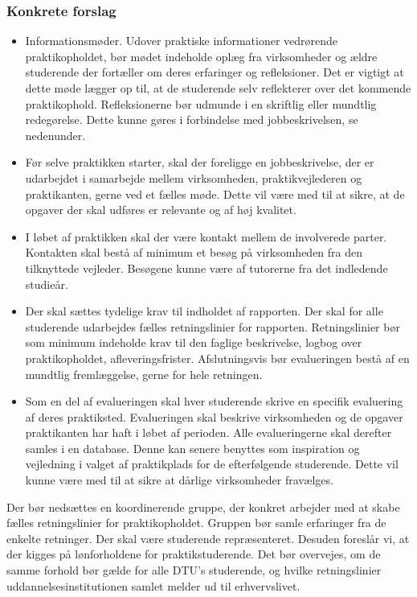 \subsubsection{Konkrete forslag}
\begin{itemize}
\item Informationsmøder. Udover praktiske informationer vedrørende praktikopholdet, bør mødet indeholde oplæg fra virksomheder og ældre studerende der fortæller om deres erfaringer og refleksioner. Det er vigtigt at dette møde lægger op til, at de studerende selv reflekterer over det kommende praktikophold. Refleksionerne bør udmunde i en skriftlig eller mundtlig redegørelse. Dette kunne gøres i forbindelse med jobbeskrivelsen, se nedenunder.

\item Før selve praktikken starter, skal der foreligge en jobbeskrivelse, der er udarbejdet i samarbejde mellem     virksomheden, praktikvejlederen og praktikanten, gerne ved et fælles møde. Dette vil være med til at sikre, at de opgaver der skal udføres er relevante og af høj kvalitet.

\item I løbet af praktikken skal der være kontakt mellem de involverede parter. Kontakten skal bestå af minimum et besøg på virksomheden fra den tilknyttede vejleder. Besøgene kunne være af tutorerne fra det indledende studieår.

\item Der skal sættes tydelige krav til indholdet af rapporten. Der skal for alle studerende udarbejdes fælles retningslinier for rapporten. Retningslinier bør som minimum indeholde krav til den faglige beskrivelse, logbog over praktikopholdet, afleveringsfrister. Afslutningsvis bør evalueringen bestå af en mundtlig fremlæggelse, gerne for hele retningen.

\item Som en del af evalueringen skal hver studerende skrive en specifik evaluering af deres praktiksted. Evalueringen skal beskrive virksomheden og de opgaver praktikanten har haft i løbet af perioden. Alle evalueringerne skal derefter samles i en database. Denne kan senere benyttes som inspiration og vejledning i valget af praktikplads for de efterfølgende studerende. Dette vil kunne være med til at sikre at dårlige virksomheder fravælges.
\end{itemize}

Der bør nedsættes en koordinerende gruppe, der konkret arbejder med at skabe fælles retningslinier for praktikopholdet. Gruppen bør samle erfaringer fra de enkelte retninger. Der skal være studerende repræsenteret. Desuden foreslår vi, at der kigges på lønforholdene for praktikstuderende. Det bør overvejes, om de samme forhold bør gælde for alle DTU’s studerende, og hvilke retningslinier uddannelsesinstitutionen samlet melder ud til erhvervslivet.

